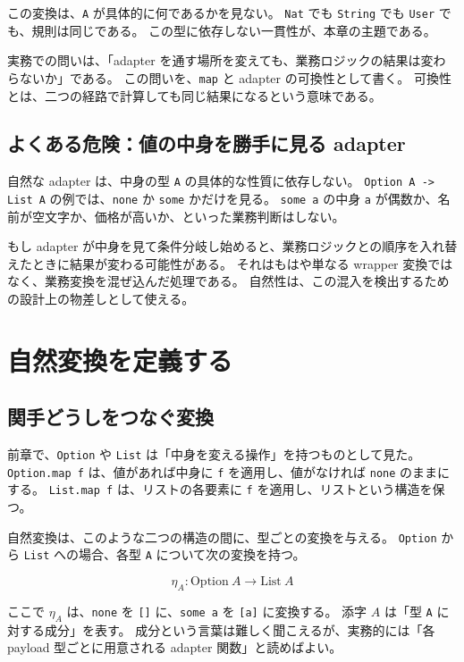この変換は、\texttt{A} が具体的に何であるかを見ない。
\texttt{Nat} でも \texttt{String} でも \texttt{User} でも、規則は同じである。
この型に依存しない一貫性が、本章の主題である。

\begin{softwarebox}
実務での問いは、「adapter を通す場所を変えても、業務ロジックの結果は変わらないか」である。
この問いを、\texttt{map} と adapter の可換性として書く。
可換性とは、二つの経路で計算しても同じ結果になるという意味である。
\end{softwarebox}

\subsection{よくある危険：値の中身を勝手に見る adapter}

自然な adapter は、中身の型 \texttt{A} の具体的な性質に依存しない。
\texttt{Option A -> List A} の例では、\texttt{none} か \texttt{some} かだけを見る。
\texttt{some a} の中身 \texttt{a} が偶数か、名前が空文字か、価格が高いか、といった業務判断はしない。

もし adapter が中身を見て条件分岐し始めると、業務ロジックとの順序を入れ替えたときに結果が変わる可能性がある。
それはもはや単なる wrapper 変換ではなく、業務変換を混ぜ込んだ処理である。
自然性は、この混入を検出するための設計上の物差しとして使える。

\section{自然変換を定義する}

\subsection{関手どうしをつなぐ変換}

前章で、\texttt{Option} や \texttt{List} は「中身を変える操作」を持つものとして見た。
\texttt{Option.map f} は、値があれば中身に \texttt{f} を適用し、値がなければ \texttt{none} のままにする。
\texttt{List.map f} は、リストの各要素に \texttt{f} を適用し、リストという構造を保つ。

自然変換は、このような二つの構造の間に、型ごとの変換を与える。
\texttt{Option} から \texttt{List} への場合、各型 \texttt{A} について次の変換を持つ。

\[
  \eta_A : \mathrm{Option}\ A \to \mathrm{List}\ A
\]

ここで \(\eta_A\) は、\texttt{none} を \texttt{[]} に、\texttt{some a} を \texttt{[a]} に変換する。
添字 \(A\) は「型 \texttt{A} に対する成分」を表す。
成分という言葉は難しく聞こえるが、実務的には「各 payload 型ごとに用意される adapter 関数」と読めばよい。

